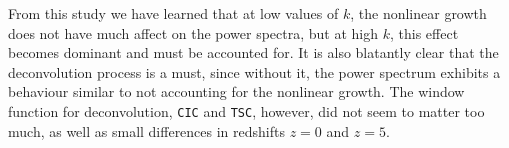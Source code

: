 \documentclass[11pt, letterpaper, twoside]{article}
\begin{document}
From this study we have learned that at low values of $k$, the nonlinear growth does not have much affect on the power spectra, but at high $k$, this effect becomes dominant and must be accounted for. It is also blatantly clear that the deconvolution process is a must, since without it, the power spectrum exhibits a behaviour similar to not accounting for the nonlinear growth. The window function for deconvolution, \verb|CIC| and \verb|TSC|, however, did not seem to matter too much, as well as small differences in redshifts $z = 0$ and $z = 5$.
\end{document}
